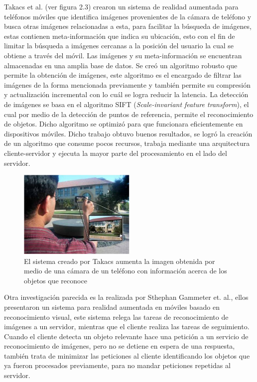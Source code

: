 \documentclass[12pt,a4paper,spanish,openany]{book}
\begin{document}
Takacs et al. (ver figura 2.3) crearon un sistema de realidad aumentada para
teléfonos móviles que identifica imágenes provenientes de la cámara de teléfono y busca otras
imágenes relacionadas a esta, para facilitar la búsqueda de imágenes, estas
contienen meta-información que indica su ubicación, esto con el fin de limitar
la búsqueda a imágenes cercanas a la posición del usuario la cual se obtiene a
través del móvil. Las imágenes y su meta-información se encuentran almacenadas
en una amplia base de datos. Se creó un algoritmo robusto que permite la obtención de
imágenes, este algoritmo es el encargado de filtrar las imágenes de la forma
mencionada previamente y también permite su compresión y actualización incremental con lo cuál se
logra reducir la latencia. La detección de imágenes se basa en el algoritmo SIFT
(\emph{Scale-invariant feature transform}), el cual por medio de la detección de
puntos de referencia, permite el reconocimiento de objetos. Dicho algoritmo
se optimizó para que funcionara eficientemente en dispositivos móviles. Dicho trabajo obtuvo buenos resultados, se logró la creación de un algoritmo que consume pocos
recursos, trabaja mediante una arquitectura cliente-servidor y ejecuta
la mayor parte del procesamiento en el lado del servidor.\cite{1460165}

\begin{figure}
\begin{center}
\includegraphics[width=0.5\textwidth]{./img/outdoorsAR.jpg}
\caption{El sistema creado por Takacs aumenta la imagen obtenida por medio de
una cámara de un teléfono con información acerca de los objetos que reconoce}
\end{center}
\end{figure}


Otra investigación parecida es la realizada por Sthephan Gammeter et. al., ellos
presentaron un sistema para realidad aumentada en móviles basado en
reconocimiento visual, este sistema relega las tareas de reconocimiento de
imágenes a un servidor, mientras que el cliente realiza las tareas de
seguimiento. Cuando el cliente detecta un objeto relevante hace una petición a
un servicio de reconocimiento de imágenes, pero no se detiene en espera
de una respuesta, también trata de minimizar las peticiones al
cliente identificando los objetos que ya fueron procesados previamente, para no
mandar peticiones repetidas al servidor. \cite{bb86741}
\end{document}
